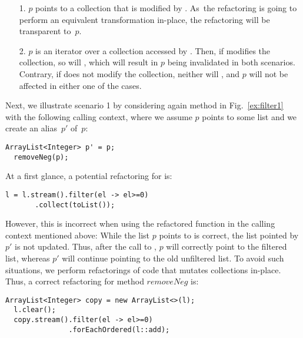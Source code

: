 \documentclass[runningheads,a4paper]{llncs}
\begin{document}
\begin{itemize}
%
\item[1.] $p$ points to a collection that is modified by .  As~the
 refactoring is going to perform an equivalent transformation
in-place, the refactoring will be transparent to~$p$.
%
\item[2.] $p$ is an iterator over a collection accessed by .  Then,
if  modifies the collection, so will , which will
result in $p$ being invalidated in both scenarios.  Contrary, if  
does not modify the collection, neither will , and $p$ will not
be affected in either one of the cases.
%
\end{itemize}


Next, we illustrate scenario 1 by 
considering again method  in
Fig.~\ref{ex:filter1} with the following calling context, where we assume
$p$ points to some list and we create an alias~$p'$ of~$p$:

\begin{lstlisting}[mathescape=true,showstringspaces=false]
  ArrayList<Integer> p' = p;
  removeNeg(p);
\end{lstlisting}

At a first glance, a potential refactoring for  is: 
\begin{lstlisting}[mathescape=true,showstringspaces=false]
  l = l.stream().filter(el -> el>=0)
       .collect(toList());
\end{lstlisting}

However, this is incorrect when using the refactored function in the
calling context mentioned above: While the
list $p$ points to is correct, the list pointed by $p'$ is not updated. Thus,
after the call to , $p$ will correctly point to the filtered
list, whereas $p'$ will continue pointing to the old unfiltered list.
%
To avoid such situations, we perform refactorings of code that mutates
collections in-place.  Thus, a correct refactoring for method
$\mathit{removeNeg}$ is:

\begin{lstlisting}[mathescape=true,showstringspaces=false]
  ArrayList<Integer> copy = new ArrayList<>(l);
  l.clear();
  copy.stream().filter(el -> el>=0)
               .forEachOrdered(l::add);
\end{lstlisting}
\end{document}
